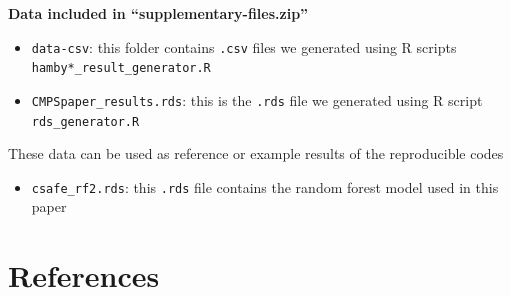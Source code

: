 \textbf{Data included in ``supplementary-files.zip''}

\begin{itemize}
\tightlist
\item
  \texttt{data-csv}: this folder contains \texttt{.csv} files we generated using R scripts \texttt{hamby*\_result\_generator.R}
\item
  \texttt{CMPSpaper\_results.rds}: this is the \texttt{.rds} file we generated using R script \texttt{rds\_generator.R}
\end{itemize}

These data can be used as reference or example results of the reproducible codes

\begin{itemize}
\tightlist
\item
  \texttt{csafe\_rf2.rds}: this \texttt{.rds} file contains the random forest model used in this paper
\end{itemize}

\hypertarget{references}{%
\section*{References}\label{references}}

